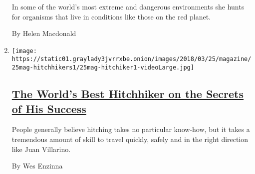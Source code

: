 \begin{enumerate}
  In some of the world's most extreme and dangerous environments she
  hunts for organisms that live in conditions like those on the red
  planet.

  By Helen Macdonald
\item
  \texttt{[image: https://static01.graylady3jvrrxbe.onion/images/2018/03/25/magazine/25mag-hitchhikers1/25mag-hitchiker1-videoLarge.jpg]}

  \hypertarget{the-worlds-best-hitchhiker-on-the-secrets-of-his-success}{%
  \subsection{\texorpdfstring{\href{/interactive/2018/03/22/magazine/voyages-worlds-greatest-hitchhiker.html}{The
  World's Best Hitchhiker on the Secrets of His
  Success}}{The World's Best Hitchhiker on the Secrets of His Success}}\label{the-worlds-best-hitchhiker-on-the-secrets-of-his-success}}

  People generally believe hitching takes no particular know-how, but it
  takes a tremendous amount of skill to travel quickly, safely and in
  the right direction like Juan Villarino.

  By Wes Enzinna
\end{enumerate}

